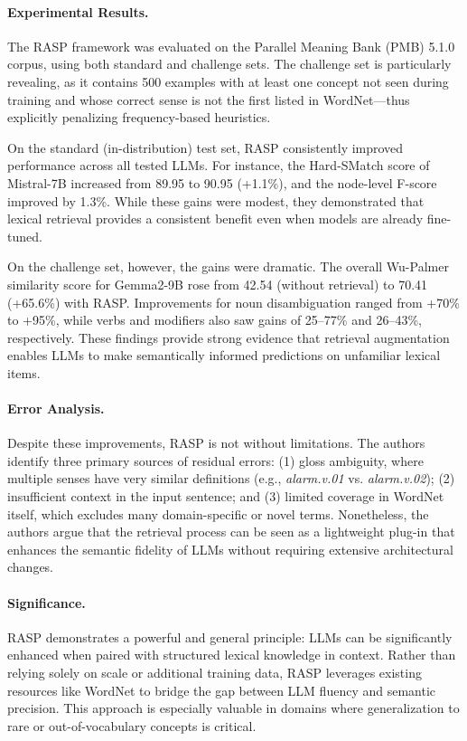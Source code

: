 \paragraph{Experimental Results.} The RASP framework was evaluated on the Parallel Meaning Bank (PMB) 5.1.0 corpus, using both standard and challenge sets. The challenge set is particularly revealing, as it contains 500 examples with at least one concept not seen during training and whose correct sense is not the first listed in WordNet—thus explicitly penalizing frequency-based heuristics.

On the standard (in-distribution) test set, RASP consistently improved performance across all tested LLMs. For instance, the Hard-SMatch score of Mistral-7B increased from 89.95 to 90.95 (+1.1\%), and the node-level F-score improved by 1.3\%. While these gains were modest, they demonstrated that lexical retrieval provides a consistent benefit even when models are already fine-tuned.

On the challenge set, however, the gains were dramatic. The overall Wu-Palmer similarity score for Gemma2-9B rose from 42.54 (without retrieval) to 70.41 (+65.6\%) with RASP. Improvements for noun disambiguation ranged from +70\% to +95\%, while verbs and modifiers also saw gains of 25--77\% and 26--43\%, respectively. These findings provide strong evidence that retrieval augmentation enables LLMs to make semantically informed predictions on unfamiliar lexical items.

\paragraph{Error Analysis.} Despite these improvements, RASP is not without limitations. The authors identify three primary sources of residual errors: (1) gloss ambiguity, where multiple senses have very similar definitions (e.g., \textit{alarm.v.01} vs. \textit{alarm.v.02}); (2) insufficient context in the input sentence; and (3) limited coverage in WordNet itself, which excludes many domain-specific or novel terms. Nonetheless, the authors argue that the retrieval process can be seen as a lightweight plug-in that enhances the semantic fidelity of LLMs without requiring extensive architectural changes.

\paragraph{Significance.} RASP demonstrates a powerful and general principle: LLMs can be significantly enhanced when paired with structured lexical knowledge in context. Rather than relying solely on scale or additional training data, RASP leverages existing resources like WordNet to bridge the gap between LLM fluency and semantic precision. This approach is especially valuable in domains where generalization to rare or out-of-vocabulary concepts is critical.

